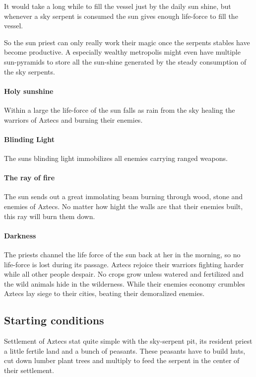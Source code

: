 \documentclass[a4paper]{article}
\begin{document}
			It would take a long while to fill the vessel just by the daily sun shine,
			but whenever a sky serpent is consumed the sun gives enough life-force
			to fill the vessel.

			So the sun priest can only really work their magic once the serpents stables
			have become productive.
			A especially wealthy metropolis might even have multiple sun-pyramids
			to store all the sun-shine generated by the steady consumption of the sky serpents.

			\paragraph{Holy sunshine}
				Within a large the life-force of the sun falls as rain from the sky healing
				the warriors of \gls{Aztecs} and burning their enemies.

			\paragraph{Blinding Light}
				The suns blinding light immobilizes all enemies carrying ranged weapons.

			\paragraph{The ray of fire}
				The sun sends out a great immolating beam burning through wood, stone and enemies
				of \gls{Aztecs}.
				No matter how hight the walls are that their enemies built,
				this ray will burn them down.

			\paragraph{Darkness}
				The priests channel the life force of the sun back at her in the morning,
				so no life-force is lost during its passage.
				\Gls{Aztecs} rejoice their warriors fighting harder while all other people
				despair.
				No crops grow unless watered and fertilized and the wild animals hide in the wilderness.
				While their enemies economy crumbles \gls{Aztecs} lay siege to their cities,
				beating their demoralized enemies.

	\subsection{Starting conditions}
		Settlement of \gls{Aztecs} stat quite simple with the sky-serpent pit,
		its resident priest a little fertile land and a bunch of peasants.
		These peasants have to build huts, cut down lumber plant trees and multiply
		to feed the serpent in the center of their settlement.
\end{document}
